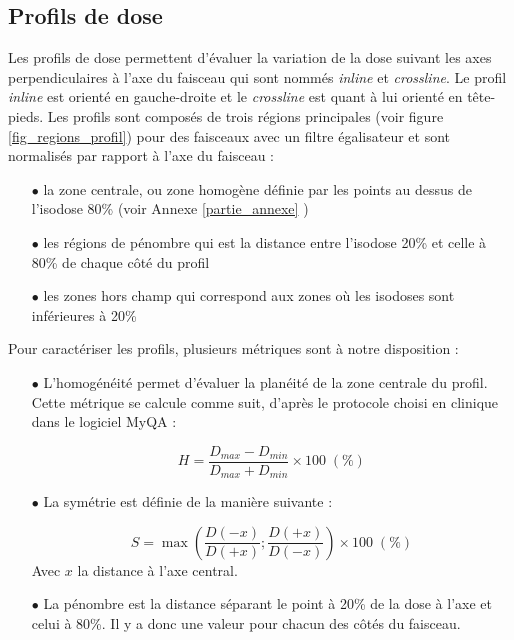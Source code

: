 \documentclass{book}
\begin{document}
\subsection{Profils de dose}

Les profils de dose permettent d'évaluer la variation de la dose suivant les axes perpendiculaires à l'axe du faisceau qui sont nommés \textit{inline} et \textit{crossline}. Le profil \textit{inline} est orienté en gauche-droite et le \textit{crossline} est quant à lui orienté en tête-pieds. Les profils sont composés de trois régions principales (voir figure \ref*{fig_regions_profil}) pour des faisceaux avec un filtre égalisateur et sont normalisés par rapport à l'axe du faisceau :

\begin{itemize}
  \item[$\bullet$] la zone centrale, ou zone homogène définie par les points au dessus de l'isodose 80\% (voir Annexe \ref{partie_annexe} \cite{ansm2007})
  \item[$\bullet$] les régions de pénombre qui est la distance entre l'isodose 20\% et celle à 80\% de chaque côté du profil
  \item[$\bullet$] les zones hors champ qui correspond aux zones où les isodoses sont inférieures à 20\%
\end{itemize}

Pour caractériser les profils, plusieurs métriques sont à notre disposition :

\begin{itemize}
  \item[$\bullet$] L'homogénéité permet d'évaluer la planéité de la zone centrale du profil. Cette métrique se calcule comme suit, d'après le protocole choisi en clinique dans le logiciel MyQA :
  
  \begin{equation}
    H = \dfrac{D_{max} - D_{min}}{D_{max} + D_{min}} \times 100 \; (\%)
    \label{eq_homogeneite}
  \end{equation}
  
  \item[$\bullet$] La symétrie est définie de la manière suivante :
  
  \begin{equation}
    S = \max\left(\dfrac{D(-x)}{D(+x)}; \dfrac{D(+x)}{D(-x)}\right) \times 100 \; (\%)
    \label{eq_symetrie}
  \end{equation}
  Avec $x$ la distance à l'axe central.
  
  \item[$\bullet$] La pénombre est la distance séparant le point à 20\% de la dose à l'axe et celui à 80\%. Il y a donc une valeur pour chacun des côtés du faisceau.  
\end{itemize}
\end{document}
